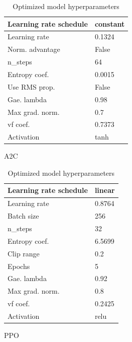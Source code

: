 \documentclass{article}
\begin{document}
\begin{table}[h]
	\begin{subtable}[h]{0.45\textwidth}
		\centering
		\begin{tabular}{|l | l|}
		\hline
		Learning rate schedule & constant  \\
		\hline
		Learning rate & 0.1324  \\
		\hline
		Norm. advantage & False  \\
		\hline
		n\_steps & 64  \\
		\hline
		Entropy coef. & 0.0015 \\
		\hline
		Use RMS prop. & False  \\
		\hline
		Gae. lambda & 0.98 \\
		\hline
		Max grad. norm. & 0.7  \\
		\hline
		vf coef. & 0.7373  \\
		\hline
		Activation  & tanh  \\
		\hline
		\end{tabular}
		\caption{A2C}
		\label{tab:a2c}
	\end{subtable}
	\hfill
	\begin{subtable}[h]{0.45\textwidth}
		\centering
		\begin{tabular}{|l | l |}
		\hline
		Learning rate schedule & linear \\
		\hline 
		Learning rate & 0.8764  \\
		\hline
		Batch size & 256  \\
		\hline
		n\_steps & 32  \\
		\hline
		Entropy coef. & 6.5699 \\
		\hline
		Clip range & 0.2  \\
		\hline
		Epochs & 5 \\
		\hline
		Gae. lambda & 0.92 \\
		\hline
		Max grad. norm. &  0.8 \\
		\hline
		vf coef. & 0.2425  \\
		\hline
		Activation & relu \\
		\hline
		\end{tabular}
		\caption{PPO}
		\label{tab:ppo}
	\end{subtable}
	\caption{Optimized model hyperparameters}
	\label{tab:hyp}
\end{table}
\end{document}
